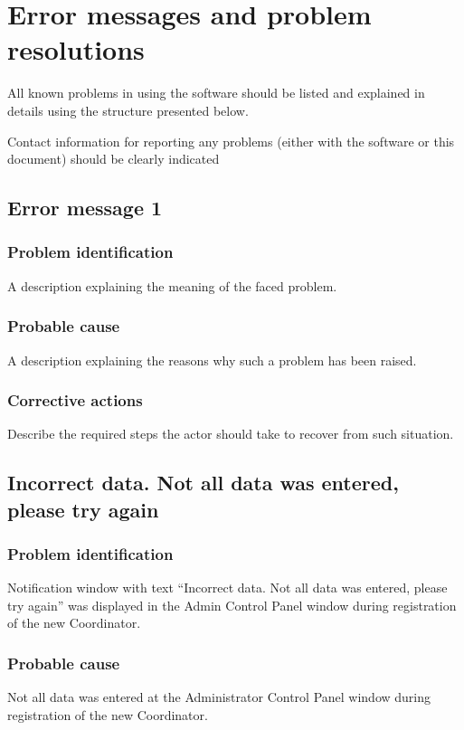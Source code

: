 
\chapter{Error messages and problem resolutions}
\label{chap:error_messages}

All known problems in using the software should be listed and explained in
details using the structure presented below.

Contact information for reporting any problems (either with the software or
this document) should be clearly indicated


\section{Error message 1}

\subsection{Problem identification}
A description explaining the meaning of the faced problem.

\subsection{Probable cause}
A description explaining the reasons why such a problem has been raised.

\subsection{Corrective actions}
Describe the required steps the actor should take to recover from such situation.


\section{Incorrect data. Not all data was entered, please try again}

\subsection{Problem identification}
Notification window with text ``Incorrect data. Not all data was entered, please
try again'' was displayed in the Admin Control Panel window during registration
of the new Coordinator.

\subsection{Probable cause}
Not all data was entered at the Administrator Control Panel window during
registration of the new Coordinator.

